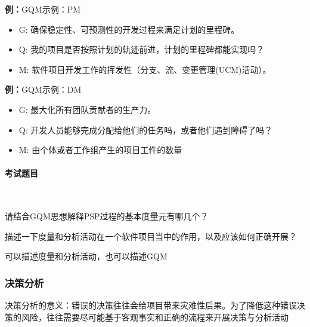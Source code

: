 \textbf{例：}GQM示例：PM
\vspace{-0.8em}
\begin{multicols}{2}
    \begin{itemize}
        \item G: 确保稳定性、可预测性的开发过程来满足计划的里程碑。
        \item Q: 我的项目是否按照计划的轨迹前进，计划的里程碑都能实现吗？
        \item M: 软件项目开发工作的挥发性（分支、流、变更管理(UCM)活动）。
    \end{itemize}
\end{multicols}
\vspace{-1em}

\textbf{例：}GQM示例：DM
\vspace{-0.8em}
\begin{multicols}{2}
    \begin{itemize}
        \item G: 最大化所有团队贡献者的生产力。
        \item Q: 开发人员能够完成分配给他们的任务吗，或者他们遇到障碍了吗？
        \item M: 由个体或者工作组产生的项目工件的数量
    \end{itemize}
\end{multicols}
\vspace{-1em}

\paragraph{考试题目}~{} \par
\begin{problem}
请结合GQM思想解释PSP过程的基本度量元有哪几个？
\end{problem}

\begin{problem}
描述一下度量和分析活动在一个软件项⽬当中的作用，以及应该如何正确开展？

可以描述度量和分析活动，也可以描述GQM
\end{problem}

\subsubsection{决策分析}
决策分析的意义：错误的决策往往会给项目带来灾难性后果。为了降低这种错误决策的风险，往往需要尽可能基于客观事实和正确的流程来开展决策与分析活动

